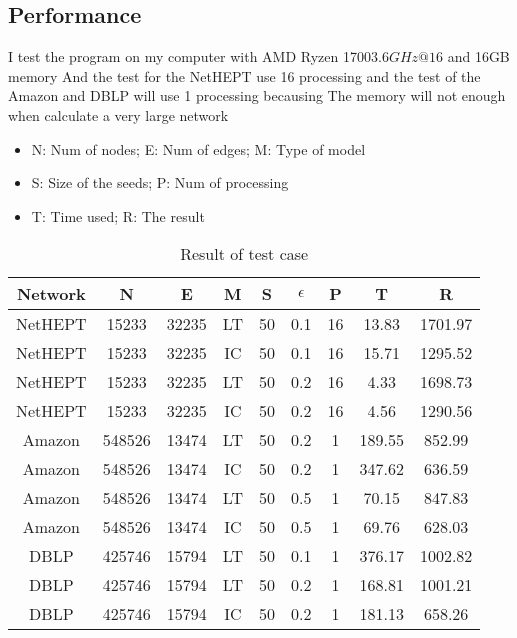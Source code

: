 \documentclass[conference,compsoc]{IEEEtran}
\begin{document}
  \subsection{Performance}
    I test the program on my computer with AMD Ryzen 1700$3.6GHz@16$ and 16GB memory
    And the test for the NetHEPT use 16 processing and the test of the Amazon and DBLP will use 1 processing becausing The memory will not enough when calculate a very large network
    \begin{itemize}
      \item N: Num of nodes; E: Num of edges; M: Type of model
      \item S: Size of the seeds; P: Num of processing
      \item T: Time used; R: The result
    \end{itemize}
    \begin{table}[!htbp]
      \centering
      \caption{Result of test case}\label{tab:aStrangeTable}
      \begin{tabular}{|c|c|c|c|c|c|c|c|c|}
        \hline
        \textbf{Network} & \textbf{N} & \textbf{E} & \textbf{M} & \textbf{S} & \textbf{$\epsilon$} &  \textbf{P} & \textbf{T} & \textbf{R}\\
        \hline
        NetHEPT&15233&32235&LT&50&0.1&16&13.83&1701.97\\
        \hline
        NetHEPT&15233&32235&IC&50&0.1&16&15.71&1295.52\\
        \hline
        NetHEPT&15233&32235&LT&50&0.2&16&4.33&1698.73\\
        \hline
        NetHEPT&15233&32235&IC&50&0.2&16&4.56&1290.56\\
        \hline
        Amazon&548526&13474&LT&50&0.2&1&189.55&852.99\\
        \hline
        Amazon&548526&13474&IC&50&0.2&1&347.62&636.59\\
        \hline
        Amazon&548526&13474&LT&50&0.5&1&70.15&847.83\\
        \hline
        Amazon&548526&13474&IC&50&0.5&1&69.76&628.03\\
        \hline
        DBLP&425746&15794&LT&50&0.1&1&376.17&1002.82\\
        \hline
        DBLP&425746&15794&LT&50&0.2&1&168.81&1001.21\\
        \hline
        DBLP&425746&15794&IC&50&0.2&1&181.13&658.26\\
        \hline
      \end{tabular}
    \end{table}
\end{document}
